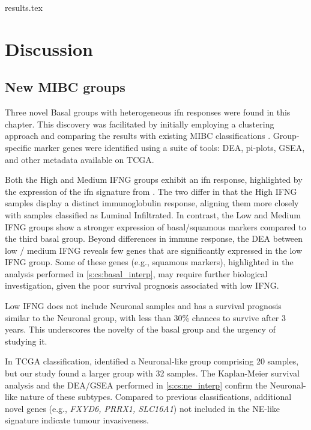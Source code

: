 {results.tex}

\section{Discussion} \label{s:cs:discussion}

\subsection*{New MIBC groups}

Three novel Basal groups with heterogeneous \acrfull{ifn} responses were found in this chapter. This discovery was facilitated by initially employing a clustering approach and comparing the results with existing MIBC classifications \citep{Baker2022-bj,Marzouka2018-ge}. Group-specific marker genes were identified using a suite of tools: DEA, pi-plots, GSEA, and other metadata available on TCGA.

Both the High and Medium IFNG groups exhibit an \acrshort{ifn} response, highlighted by the expression of the \acrshort{ifn} signature from \citet{Baker2022-bj}. The two differ in that the High IFNG samples display a distinct immunoglobulin response, aligning them more closely with samples classified as Luminal Infiltrated. In contrast, the Low and Medium IFNG groups show a stronger expression of basal/squamous markers compared to the third basal group. Beyond differences in immune response, the DEA between low / medium IFNG reveals few genes that are significantly expressed in the low IFNG group. Some of these genes (e.g., squamous markers), highlighted in the analysis performed in \cref{s:cs:basal_interp}, may require further biological investigation, given the poor survival prognosis associated with low IFNG.

Low IFNG does not include Neuronal samples and has a survival prognosis similar to the Neuronal group, with less than 30\% chances to survive after 3 years. This underscores the novelty of the basal group and the urgency of studying it.

In TCGA classification, \citet{Robertson2017-mg} identified a Neuronal-like group comprising 20 samples, but our study found a larger group with 32 samples. The Kaplan-Meier survival analysis and the DEA/GSEA performed in \cref{s:cs:ne_interp} confirm the Neuronal-like nature of these subtypes. Compared to previous classifications, additional novel genes (e.g., \textit{FXYD6, PRRX1, SLC16A1}) not included in the NE-like signature indicate tumour invasiveness.

